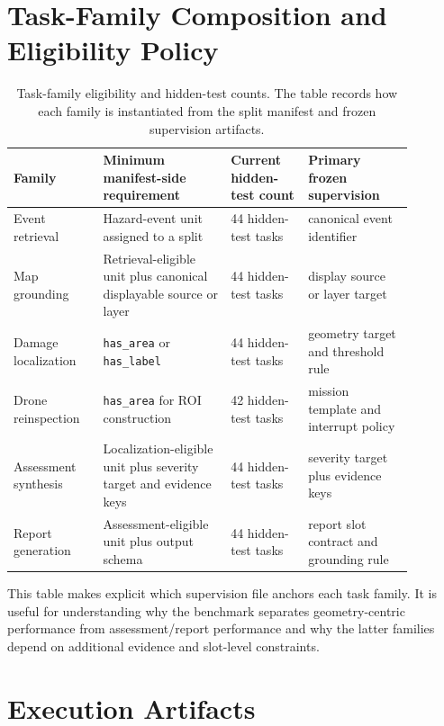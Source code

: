 \documentclass{article}
\begin{document}
\section{Task-Family Composition and Eligibility Policy}

\begin{table}[ht]
    \centering
    \small
    \caption{Task-family eligibility and hidden-test counts. The table records how each family is instantiated from the split manifest and frozen supervision artifacts.}
    \label{tab:family-eligibility}
    \begin{tabular}{L{0.19\linewidth}L{0.29\linewidth}L{0.17\linewidth}L{0.23\linewidth}}
        \toprule
        Family & Minimum manifest-side requirement & Current hidden-test count & Primary frozen supervision \\
        \midrule
        Event retrieval & Hazard-event unit assigned to a split & 44 hidden-test tasks & canonical event identifier \\
        Map grounding & Retrieval-eligible unit plus canonical displayable source or layer & 44 hidden-test tasks & display source or layer target \\
        Damage localization & \texttt{has\_area} or \texttt{has\_label} & 44 hidden-test tasks & geometry target and threshold rule \\
        Drone reinspection & \texttt{has\_area} for ROI construction & 42 hidden-test tasks & mission template and interrupt policy \\
        Assessment synthesis & Localization-eligible unit plus severity target and evidence keys & 44 hidden-test tasks & severity target plus evidence keys \\
        Report generation & Assessment-eligible unit plus output schema & 44 hidden-test tasks & report slot contract and grounding rule \\
        \bottomrule
    \end{tabular}
\end{table}

This table makes explicit which supervision file anchors each task family. It is useful for understanding why the benchmark separates geometry-centric performance from assessment/report performance and why the latter families depend on additional evidence and slot-level constraints.

\section{Execution Artifacts}
\end{document}
